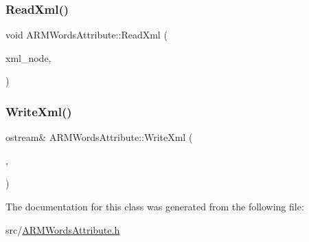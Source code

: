 \mbox{\label{classARMWordsAttribute_a661a7fbe6c6eab0a5e0c371525d92961}} 
\subsubsection{\texorpdfstring{Read\+Xml()}{ReadXml()}}
{\footnotesize\ttfamily void A\+R\+M\+Words\+Attribute\+::\+Read\+Xml (\begin{DoxyParamCaption}\item[{Xml\+Tag const $\ast$}]{xml\+\_\+node,  }\item[{cfglib\+::\+Handle \&}]{ }\end{DoxyParamCaption})}

\mbox{\label{classARMWordsAttribute_ad0061dc1aaa8a4a8264885f39798372c}} 
\subsubsection{\texorpdfstring{Write\+Xml()}{WriteXml()}}
{\footnotesize\ttfamily ostream\& A\+R\+M\+Words\+Attribute\+::\+Write\+Xml (\begin{DoxyParamCaption}\item[{std\+::ostream \&}]{,  }\item[{cfglib\+::\+Handle \&}]{ }\end{DoxyParamCaption})}



The documentation for this class was generated from the following file\+:\begin{DoxyCompactItemize}
\item 
src/\hyperlink{ARMWordsAttribute_8h}{A\+R\+M\+Words\+Attribute.\+h}\end{DoxyCompactItemize}
